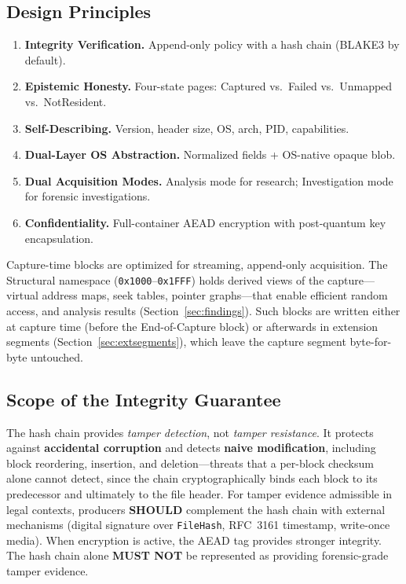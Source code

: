 \documentclass[11pt,a4paper]{article}
\newcommand{\MUSTNOT}{\textbf{MUST NOT}}
\newcommand{\SHOULD}{\textbf{SHOULD}}
\newcommand{\hex}[1]{\texttt{0x#1}}
\newcommand{\field}[1]{\texttt{#1}}
\newcommand{\blake}{BLAKE3}
\begin{document}
\subsection{Design Principles}
\begin{enumerate}[leftmargin=1.8em, itemsep=2pt]
\item \textbf{Integrity Verification.} Append-only policy with a hash chain (\blake{} by default).
\item \textbf{Epistemic Honesty.} Four-state pages: Captured vs.\ Failed vs.\ Unmapped vs.\ NotResident.
\item \textbf{Self-Describing.} Version, header size, OS, arch, PID, capabilities.
\item \textbf{Dual-Layer OS Abstraction.} Normalized fields + OS-native opaque blob.
\item \textbf{Dual Acquisition Modes.} Analysis mode for research; Investigation mode for forensic investigations.
\item \textbf{Confidentiality.} Full-container AEAD encryption with post-quantum key encapsulation.
\end{enumerate}

Capture-time blocks are optimized for streaming, append-only acquisition. The Structural namespace (\hex{1000}--\hex{1FFF}) holds derived views of the capture---virtual address maps, seek tables, pointer graphs---that enable efficient random access, and analysis results (Section~\ref{sec:findings}). Such blocks are written either at capture time (before the End-of-Capture block) or afterwards in extension segments (Section~\ref{sec:extsegments}), which leave the capture segment byte-for-byte untouched.

\subsection{Scope of the Integrity Guarantee}\label{sec:integrityscope}
The hash chain provides \emph{tamper detection}, not \emph{tamper resistance}. It protects against \textbf{accidental corruption} and detects \textbf{naive modification}, including block reordering, insertion, and deletion---threats that a per-block checksum alone cannot detect, since the chain cryptographically binds each block to its predecessor and ultimately to the file header. For tamper evidence admissible in legal contexts, producers \SHOULD{} complement the hash chain with external mechanisms (digital signature over \field{FileHash}, RFC~3161 timestamp, write-once media). When encryption is active, the AEAD tag provides stronger integrity. The hash chain alone \MUSTNOT{} be represented as providing forensic-grade tamper evidence.
\end{document}
